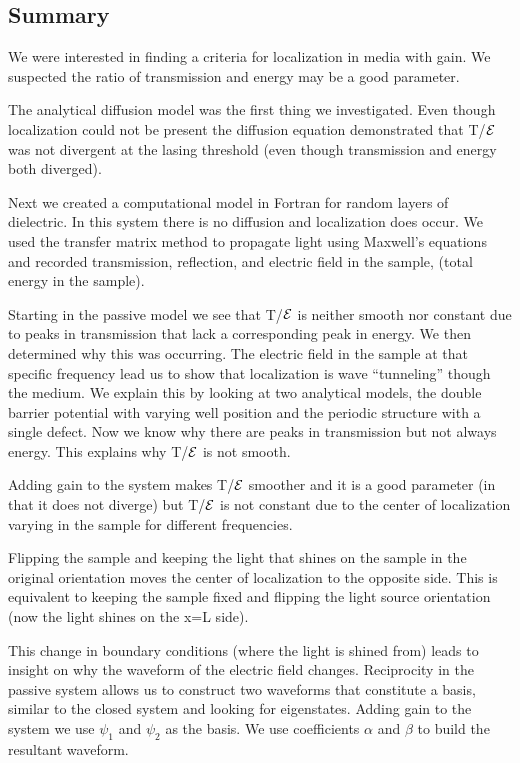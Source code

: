 \subsection {Summary}

We were interested in finding a criteria for localization in media with gain.  We suspected the ratio of transmission and energy may be a good parameter.

The analytical diffusion model was the first thing we investigated.  Even though localization could not be present the diffusion equation demonstrated that T/${\cal E}$ was not divergent at the lasing threshold (even though transmission and energy both diverged). 

Next we created a computational model in Fortran for random layers of dielectric.  In this system there is no diffusion and localization does occur.  We used the transfer matrix method to propagate light using Maxwell's equations and recorded transmission, reflection, and electric field in the sample, (total energy in the sample).

Starting in the passive model we see that T/${\cal E}$ is neither smooth nor constant due to peaks in transmission that lack a corresponding peak in energy.  We then determined why this was occurring.  The electric field in the sample at that specific frequency lead us to show that localization is wave ``tunneling'' though the medium. We explain this by looking at two analytical models, the double barrier potential with varying well position and the periodic structure with a single defect. Now we know why there are peaks in transmission but not always energy. This explains why T/${\cal E}$ is not smooth.

Adding gain to the system makes T/${\cal E}$ smoother and it is a good parameter (in that it does not diverge) but T/${\cal E}$ is not constant due to the center of localization varying in the sample for different frequencies.

Flipping the sample and keeping the light that shines on the sample in the original orientation moves the center of localization to the opposite side. This is equivalent to keeping the sample fixed and flipping the light source orientation (now the light shines on the x=L side).

This change in boundary conditions (where the light is shined from) leads to insight on why the waveform of the electric field changes.  Reciprocity in the passive system allows us to construct two waveforms that constitute a basis, similar to the closed system and looking for eigenstates.  Adding gain to the system we use $\psi _1 $ and $\psi _2 $ as the basis.  We use coefficients $\alpha$ and $\beta$ to build the resultant waveform.

